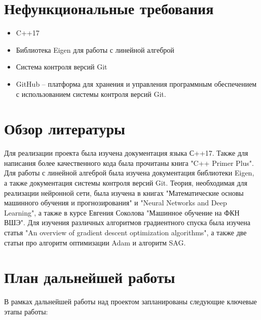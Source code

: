 \documentclass{article}
\begin{document}
\section{Нефункциональные требования}
\begin{itemize}
    \item C++17
    \item Библиотека Eigen для работы с линейной алгеброй
    \item Система контроля версий Git
    \item GitHub – платформа для хранения и управления программным обеспечением с использованием системы контроля версий Git. 
\end{itemize}

\section{Обзор литературы}

Для реализации проекта была изучена документация языка С++17\cite{cppreference}. Также для написания более качественного кода была прочитаны книга "C++ Primer Plus"\cite{pratac++}. Для работы с линейной алгеброй была изучена документация библиотеки Eigen\cite{eigen}, а также документация системы контроля версий Git\cite{git}. Теория, необходимая для реализации нейронной сети, была изучена в книгах "Математические основы машинного обучения и прогнозирования"\cite{math_ml} и "Neural Networks and Deep Learning"\cite{nnndl}, а также в курсе Евгения Соколова "Машинное обучение на ФКН ВШЭ"\cite{ml_sokolov}. Для изучения различных алгоритмов градиентного спуска была изучена статья "An overview of gradient descent optimization algorithms"\cite{optimization_algorithms}, а также две статьи про алгоритм оптимизации Adam\cite{adam} и алгоритм SAG\cite{stochastic}.

\section{План дальнейшей работы}

В рамках дальнейшей работы над проектом запланированы следующие ключевые этапы работы:
\end{document}
